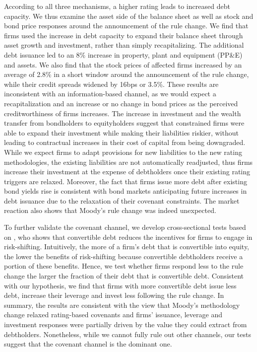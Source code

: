 \documentclass[a4paper, 12pt]{article}
\begin{document}
According to all three mechanisms, a higher rating leads to increased debt capacity. We thus examine the asset side of the balance sheet as well as stock and bond price responses around the announcement of the rule change. We find that firms used the increase in debt capacity to expand their balance sheet through asset growth and investment, rather than simply recapitalizing. The additional debt issuance led to an 8\% increase in property, plant and equipment (PP\&E) and assets. We also find that the stock prices of affected firms increased by an average of 2.8\% in a short window around the announcement of the rule change, while their credit spreads widened by 16bps or 3.5\%. These results are inconsistent with an information-based channel, as we would expect a recapitalization and an increase or no change in bond prices as the perceived creditworthiness of firms increases. The increase in investment and the wealth transfer from bondholders to equityholders suggest that constrained firms were able to expand their investment while making their liabilities riskier, without leading to contractual increases in their cost of capital from being downgraded. While we expect firms to adapt provisions for new liabilities to the new rating methodologies, the existing liabilities are not automatically readjusted, thus firms increase their investment at the expense of debtholders once their existing rating triggers are relaxed. Moreover, the fact that firms issue more debt after existing bond yields rise is consistent with bond markets anticipating future increases in debt issuance due to the relaxation of their covenant constraints. The market reaction also shows that Moody's rule change was indeed unexpected.

To further validate the covenant channel, we develop cross-sectional tests based on \cite{green1984investment}, who shows that convertible debt reduces the incentives for firms to engage in risk-shifting. Intuitively, the more of a firm's debt that is convertible into equity, the lower the benefits of risk-shifting because convertible debtholders receive a portion of these benefits. Hence, we test whether firms respond less to the rule change the larger the fraction of their debt that is convertible debt. Consistent with our hypothesis, we find that firms with more convertible debt issue less debt, increase their leverage and invest less following the rule change. In summary, the results are consistent with the view that Moody's methodology change relaxed rating-based covenants and firms' issuance, leverage and investment responses were partially driven by the value they could extract from debtholders. Nonetheless, while we cannot fully rule out other channels, our tests suggest that the covenant channel is the dominant one.
\end{document}
